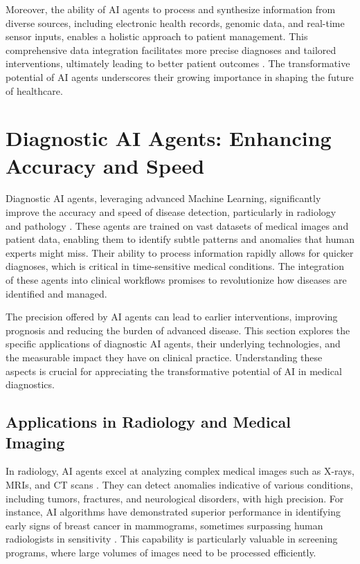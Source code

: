 \documentclass[12pt,a4paper]{article}
\begin{document}
Moreover, the ability of AI agents to process and synthesize information from diverse sources, including electronic health records, genomic data, and real-time sensor inputs, enables a holistic approach to patient management. This comprehensive data integration facilitates more precise diagnoses and tailored interventions, ultimately leading to better patient outcomes \cite{wang2019deep}. The transformative potential of AI agents underscores their growing importance in shaping the future of healthcare.

\section{Diagnostic AI Agents: Enhancing Accuracy and Speed}
\label{sec:diagnostic-ai}
Diagnostic AI agents, leveraging advanced Machine Learning, significantly improve the accuracy and speed of disease detection, particularly in radiology and pathology \cite{rajpurkar2017chexnet}. These agents are trained on vast datasets of medical images and patient data, enabling them to identify subtle patterns and anomalies that human experts might miss. Their ability to process information rapidly allows for quicker diagnoses, which is critical in time-sensitive medical conditions. The integration of these agents into clinical workflows promises to revolutionize how diseases are identified and managed.

The precision offered by AI agents can lead to earlier interventions, improving prognosis and reducing the burden of advanced disease. This section explores the specific applications of diagnostic AI agents, their underlying technologies, and the measurable impact they have on clinical practice. Understanding these aspects is crucial for appreciating the transformative potential of AI in medical diagnostics.

\subsection{Applications in Radiology and Medical Imaging}
\label{subsec:radiology-applications}
In radiology, AI agents excel at analyzing complex medical images such as X-rays, MRIs, and CT scans \cite{esteva2017dermatologist}. They can detect anomalies indicative of various conditions, including tumors, fractures, and neurological disorders, with high precision. For instance, AI algorithms have demonstrated superior performance in identifying early signs of breast cancer in mammograms, sometimes surpassing human radiologists in sensitivity \cite{mckinney2020international}. This capability is particularly valuable in screening programs, where large volumes of images need to be processed efficiently.
\end{document}
